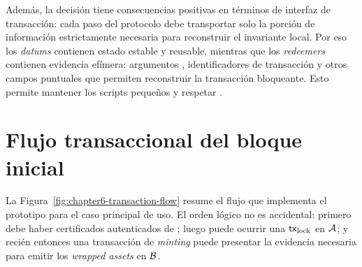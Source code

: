 Además, la decisión tiene consecuencias positivas en términos de interfaz de transacción: cada paso del protocolo debe transportar solo la porción de información estrictamente necesaria para reconstruir el invariante local. Por eso los \textit{datums} contienen estado estable y reusable, mientras que los \textit{redeemers} contienen evidencia efímera: argumentos \ZK, identificadores de transacción y otros campos puntuales que permiten reconstruir la transacción bloqueante. Esto permite mantener los scripts pequeños y respetar \maxTxSize.

\section{Flujo transaccional del bloque inicial}
\label{sec:validadores-y-flujo-transaccional-flujo-transaccional-del-bloque-inicial}

La Figura~\ref{fig:chapter6-transaction-flow} resume el flujo que implementa el prototipo para el caso principal de uso. El orden lógico no es accidental: primero debe haber certificados autenticados de \StakeDistribution; luego puede ocurrir una $\mathsf{tx}_{\mathrm{lock}}$ en $\mathcal{A}$; y recién entonces una transacción de \textit{minting} puede presentar la evidencia necesaria para emitir los \textit{wrapped assets} en $\mathcal{B}$.

